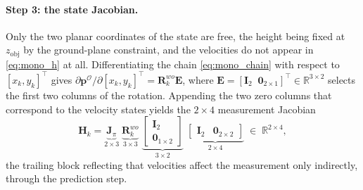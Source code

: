 \paragraph*{Step 3: the state Jacobian.} Only the two planar coordinates of the
state are free, the height being fixed at $z_{\mathrm{obj}}$ by the ground-plane
constraint, and the velocities do not appear in \eqref{eq:mono_h} at all.
Differentiating the chain \eqref{eq:mono_chain} with respect to $[x_k,y_k]^{\top}$
gives $\partial\bm{p}^{\mathcal{O}}/\partial[x_k,y_k]^{\top}=\bm{R}^{wo}_k\bm{E}$,
where $\bm{E}=[\bm{I}_2\;\;\bm{0}_{2\times1}]^{\top}\in\mathbb{R}^{3\times2}$
selects the first two columns of the rotation. Appending the two zero columns that
correspond to the velocity states yields the $2\times4$ measurement Jacobian
\begin{equation}
  \bm{H}_k
  = \underbrace{\bm{J}_{\pi}}_{2\times3}\;
    \underbrace{\bm{R}^{wo}_k}_{3\times3}\;
    \underbrace{\begin{bmatrix}\bm{I}_2\\\bm{0}_{1\times2}\end{bmatrix}}_{3\times2}\;
    \underbrace{\begin{bmatrix}\bm{I}_2 & \bm{0}_{2\times2}\end{bmatrix}}_{2\times4}
  \;\in\;\mathbb{R}^{2\times4},
  \label{eq:Hmono}
\end{equation}
the trailing block reflecting that velocities affect the measurement only
indirectly, through the prediction step.

